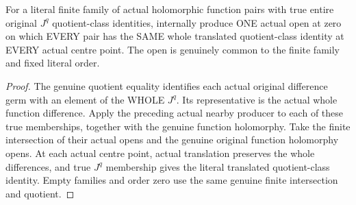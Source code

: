 \begin{theorem}
\label{hir:relative-normal-power-spread-finite-whole-jet-identities}
\leanok
{}
For a literal finite family of actual holomorphic function pairs with true
entire original $J^q$ quotient-class identities, internally produce ONE
actual open at zero on which EVERY pair has the SAME whole translated
quotient-class identity at EVERY actual centre point. The open is genuinely
common to the finite family and fixed literal order.
\end{theorem}
\begin{proof}
The genuine quotient equality identifies each actual original difference
germ with an element of the WHOLE $J^q$. Its representative is the actual
whole function difference. Apply the preceding actual nearby producer to
each of these true memberships, together with the genuine function
holomorphy. Take the finite intersection of their actual opens and the
genuine original function holomorphy opens. At each actual centre point,
actual translation preserves the whole differences, and true $J^q$
membership gives the literal translated quotient-class identity. Empty
families and order zero use the same genuine finite intersection and quotient.
\end{proof}

